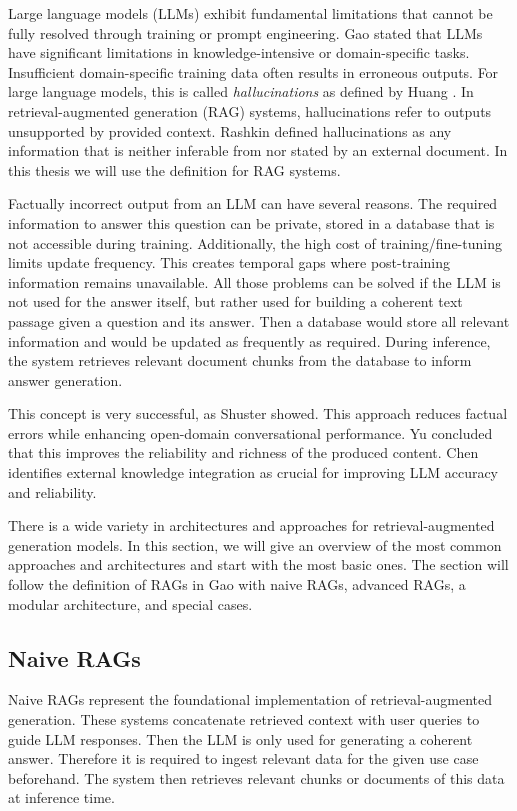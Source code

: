 Large language models (LLMs) exhibit fundamental limitations that cannot be fully resolved through training or prompt engineering. Gao \cite{Gao.18.12.2023} stated that LLMs have significant limitations in knowledge-intensive or domain-specific tasks. Insufficient domain-specific training data often results in erroneous outputs. For large language models, this is called \textit{hallucinations} as defined by Huang \cite{Huang_2023}. In retrieval-augmented generation (RAG) systems, hallucinations refer to outputs unsupported by provided context. Rashkin \cite{Rashkin.} defined hallucinations as any information that is neither inferable from nor stated by an external document. In this thesis we will use the definition for RAG systems.

Factually incorrect output from an LLM can have several reasons. The required information to answer this question can be private, stored in a database that is not accessible during training. Additionally, the high cost of training/fine-tuning limits update frequency. This creates temporal gaps where post-training information remains unavailable. All those problems can be solved if the LLM is not used for the answer itself, but rather used for building a coherent text passage given a question and its answer. Then a database would store all relevant information and would be updated as frequently as required. During inference, the system retrieves relevant document chunks from the database to inform answer generation.

This concept is very successful, as Shuster \cite{Shuster.} showed. This approach reduces factual errors while enhancing open-domain conversational performance. Yu \cite{Yu.2024} concluded that this improves the reliability and richness of the produced content. Chen \cite{Chen.2024} identifies external knowledge integration as crucial for improving LLM accuracy and reliability.

There is a wide variety in architectures and approaches for retrieval-augmented generation models. In this section, we will give an overview of the most common approaches and architectures and start with the most basic ones. The section will follow the definition of RAGs in Gao \cite{Gao.18.12.2023} with naive RAGs, advanced RAGs, a modular architecture, and special cases.

\subsection{Naive RAGs}
\label{sec:naive_rags}
Naive RAGs represent the foundational implementation of retrieval-augmented generation. These systems concatenate retrieved context with user queries to guide LLM responses. Then the LLM is only used for generating a coherent answer. Therefore it is required to ingest relevant data for the given use case beforehand. The system then retrieves relevant chunks or documents of this data at inference time. 


